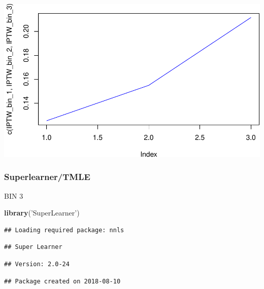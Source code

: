 \documentclass[]{article}
\newenvironment{Shaded}{\begin{snugshade}}{\end{snugshade}}
\newcommand{\KeywordTok}[1]{\textcolor[rgb]{0.13,0.29,0.53}{\textbf{#1}}}
\newcommand{\StringTok}[1]{\textcolor[rgb]{0.31,0.60,0.02}{#1}}
\newcommand{\NormalTok}[1]{#1}
\begin{document}
\includegraphics{framingham_files/figure-latex/unnamed-chunk-10-1.pdf}

\subsubsection{Superlearner/TMLE}\label{superlearnertmle}

BIN 3

\begin{Shaded}
\begin{Highlighting}[]
\KeywordTok{library}\NormalTok{(}\StringTok{'SuperLearner'}\NormalTok{)}
\end{Highlighting}
\end{Shaded}

\begin{verbatim}
## Loading required package: nnls
\end{verbatim}

\begin{verbatim}
## Super Learner
\end{verbatim}

\begin{verbatim}
## Version: 2.0-24
\end{verbatim}

\begin{verbatim}
## Package created on 2018-08-10
\end{verbatim}
\end{document}
